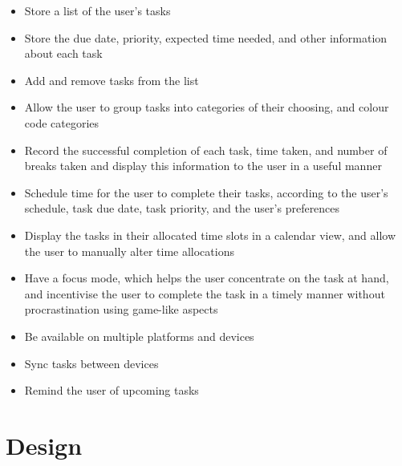 \documentclass{article}
\begin{document}
\begin{itemize}
\item Store a list of the user's tasks
\item Store the due date, priority, expected time needed, and other information
  about each task
\item Add and remove tasks from the list
\item Allow the user to group tasks into categories of their choosing, and
  colour code categories
\item Record the successful completion of each task, time taken, and number of
  breaks taken and display this information to the user in a useful manner
\item Schedule time for the user to complete their tasks, according to the
  user's schedule, task due date, task priority, and the user's preferences
\item Display the tasks in their allocated time slots in a calendar view, and
  allow the user to manually alter time allocations
\item Have a focus mode, which helps the user concentrate on the task at hand,
  and incentivise the user to complete the task in a timely manner without
  procrastination using game-like aspects
\item Be available on multiple platforms and devices
\item Sync tasks between devices
\item Remind the user of upcoming tasks
\end{itemize}


\part{Design}
\end{document}
